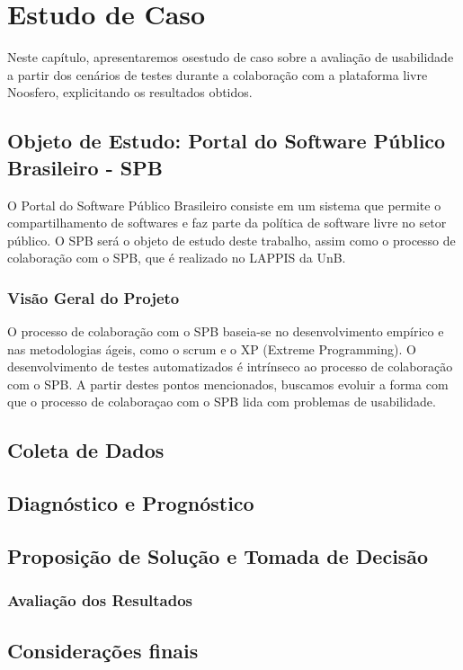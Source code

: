 \chapter{Estudo de Caso}

Neste capítulo, apresentaremos osestudo de caso sobre a avaliação de usabilidade a partir dos cenários de testes durante a colaboração com a plataforma livre Noosfero, explicitando os resultados obtidos.
%

\section{Objeto de Estudo: Portal do Software Público Brasileiro - SPB}

O Portal do Software Público Brasileiro consiste em um sistema que permite o compartilhamento de softwares e faz parte da política de software livre no setor público.
O SPB será o objeto de estudo deste trabalho, assim como o processo de colaboração com o SPB, que é realizado no LAPPIS da UnB.

\subsection{Visão Geral do Projeto}

O processo de colaboração com o SPB baseia-se no desenvolvimento empírico e nas metodologias ágeis, como o scrum e o XP (Extreme Programming). O desenvolvimento de testes automatizados é intrínseco ao processo de colaboração com o SPB. A partir destes pontos mencionados, buscamos evoluir a forma com que o processo de colaboraçao com o SPB lida com problemas de usabilidade.



\section{Coleta de Dados}

\section{Diagnóstico e Prognóstico}

\section{Proposição de Solução e Tomada de Decisão}

\subsection{Avaliação dos Resultados}

\section{Considerações finais}







